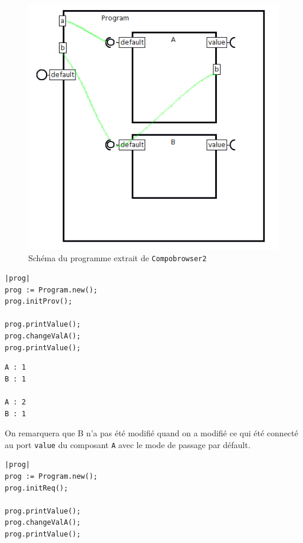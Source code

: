 \documentclass[11pt,a4paper,openany,oneside]{book}
\begin{document}
\begin{appendices}
\begin{figure}[H]
\centering
\includegraphics[scale=0.7, keepaspectratio=true]{passagereqprov}
\caption{Schéma du programme extrait de \texttt{Compobrowser2}}
\label{passagereqprov}
\end{figure}



\newpage

\begin{lstlisting}[language=Compo, frame=single, caption=Workspace (Passage par Fournis)]
|prog|
prog := Program.new();
prog.initProv();

prog.printValue();
prog.changeValA();
prog.printValue();
\end{lstlisting}


\begin{lstlisting}[language=Compo, frame=single, caption=Output]
A : 1
B : 1

A : 2
B : 1
\end{lstlisting}

On remarquera que B n'a pas été modifié quand on a modifié ce qui été connecté au port \texttt{value} du composant \texttt{A} avec le mode de passage par défault.

\begin{lstlisting}[language=Compo, frame=single, caption=Workspace (Passage par Requis)]
|prog|
prog := Program.new();
prog.initReq();

prog.printValue();
prog.changeValA();
prog.printValue();
\end{lstlisting}



\end{appendices}
\end{document}

